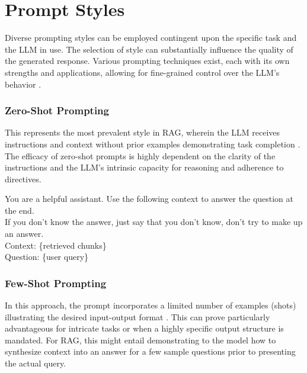\section{Prompt Styles}
Diverse prompting styles can be employed contingent upon the specific task and the LLM in use. The selection of style can substantially influence the quality of the generated response. Various prompting techniques exist, each with its own strengths and applications, allowing for fine-grained control over the LLM's behavior \autocite{liu2023gevalnlgevaluationusing}.

\subsubsection{Zero-Shot Prompting}
This represents the most prevalent style in RAG, wherein the LLM receives instructions and context without prior examples demonstrating task completion \autocite{brown2020languagemodelsfewshotlearners}. The efficacy of zero-shot prompts is highly dependent on the clarity of the instructions and the LLM's intrinsic capacity for reasoning and adherence to directives.


\begin{tcolorbox}[promptbox,title=Example: Zero-Shot Prompting]
You are a helpful assistant. Use the following context to answer the question at the end.\\
If you don't know the answer, just say that you don't know, don't try to make up an answer.\\

Context: \{retrieved chunks\}\\

Question: \{user query\}
\end{tcolorbox}
    
\subsubsection{Few-Shot Prompting}
In this approach, the prompt incorporates a limited number of examples (shots) illustrating the desired input-output format \autocite{brown2020languagemodelsfewshotlearners}. This can prove particularly advantageous for intricate tasks or when a highly specific output structure is mandated. For RAG, this might entail demonstrating to the model how to synthesize context into an answer for a few sample questions prior to presenting the actual query.


